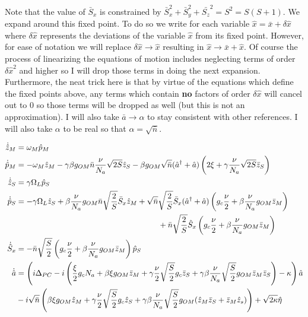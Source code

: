 \documentclass[12pt]{article}
\begin{document}
Note that the value of $\bar{S}_x$ is constrained by $\bar{S}_x^2+\bar{S}_y^2+\bar{S_z}^2 = S^2 = S(S+1)$. We expand around this fixed point. To do so we write for each variable $\hat{x} = \bar{x} + \delta \hat{x}$ where $\delta \hat{x}$ represents the deviations of the variable $\hat{x}$ from its fixed point. However, for ease of notation we will replace $\delta \hat{x} \rightarrow \hat{x}$ resulting in $\hat{x} \rightarrow \bar{x} + \hat{x}$. Of course the process of linearizing the equations of motion includes neglecting terms of order $\delta \hat{x}^2$ and higher so I will drop those terms in doing the next expansion. Furthermore, the neat trick here is that by virtue of the equations which define the fixed points above, any terms which contain \textbf{no} factors of order $\delta \hat{x}$ will cancel out to 0 so those terms will be dropped as well (but this is not an approximation). I will also take $\bar{a} \rightarrow \alpha$ to stay consistent with other references. I will also take $\alpha$ to be real so that $\alpha = \sqrt{\bar{n}}$.

\begin{align*}
\dot{\hat{z}}_M & = \omega_M \hat{p}_M \\
\dot{\hat{p}}_M & = -\omega_M \hat{z}_M - \gamma \beta g_{OM} \bar{n}\frac{\nu}{N_a} \sqrt{2S} \hat{z}_S -  \beta g_{OM} \sqrt{\bar{n}} (\hat{a}^{\dag} + \hat{a})\left(2\xi + \gamma\frac{\nu}{N_a} \sqrt{2S} \bar{z}_S \right) \\
\dot{\hat{z}}_S & = \gamma \Omega_L \hat{p}_S \\
\dot{\hat{p}}_S & = -\gamma \Omega_L \hat{z}_S + \beta\frac{\nu}{N_a} g_{OM} \bar{n} \sqrt{\frac{2}{S}} \bar{S}_x \hat{z}_M + \sqrt{\bar{n}} \sqrt{\frac{2}{S}} \bar{S}_x (\hat{a}^{\dag} + \hat{a}) \left( g_c \frac{\nu}{2} + \beta \frac{\nu}{N_a}  g_{OM} \bar{z}_M \right)\\
& \hspace{2.5 in} + \bar{n} \sqrt{\frac{2}{S}} \hat{S}_x \left( g_c \frac{\nu}{2} + \beta \frac{\nu}{N_a}  g_{OM} \bar{z}_M \right)\\
\dot{\hat{S}}_x & = - \bar{n} \sqrt{\frac{S}{2}} \left(g_c \frac{\nu}{2} + \beta \frac{\nu}{N_a} g_{OM} \bar{z}_M \right) \hat{p}_S \\
\dot{\hat{a}} & =  \left( i \Delta_{PC} - i \left(\frac{\xi}{2} g_c N_a + \beta \xi g_{OM} \bar{z}_M + \gamma \frac{\nu}{2} \sqrt{\frac{S}{2}} g_c \bar{z}_S + \gamma \beta \frac{\nu}{N_a} \sqrt{\frac{S}{2}} g_{OM} \bar{z}_M \bar{z}_S \right) - \kappa   \right)\hat{a} \\
& - i \sqrt{\bar{n}} \left( \beta \xi g_{OM} \hat{z}_M + \gamma \frac{\nu}{2} \sqrt{\frac{S}{2}} g_c \hat{z}_S + \gamma \beta \frac{\nu}{N_a} \sqrt{\frac{S}{2}} g_{OM} (\hat{z}_M \bar{z}_S + \bar{z}_M \hat{z}_s) \right) + \sqrt{2 \kappa} \hat{\eta}
\end{align*}
\end{document}
